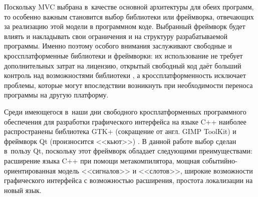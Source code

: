 \documentclass[a4paper, 14pt]{extarticle}
\newcommand{\eng}[1]{{\English #1}}
\begin{document}

  Поскольку MVC выбрана в~качестве основной архитектуры для обеих программ, то особенно важным
  становится выбор библиотеки или фреймворка, отвечающих за реализацию этой модели в программном
  коде. Выбранный фреймворк будет влиять и накладывать свои ограничения и на
  структуру разрабатываемой программы. Именно поэтому особого внимания заслуживают свободные и
  кроссплатформенные библиотеки и фреймворки: их использование не требует дополнительных затрат на
  лицензию, открытый свободный код даёт больший контроль над возможностями библиотеки \cite{open-source},
  а кроссплатформенность исключает проблемы, которые могут впоследствии возникнуть при необходимости
  переноса программы на другую платформу.

  Среди имеющегося в~наши дни свободного кросплатформенных программного обеспечения для разработки
  графического интерфейса на языке C++ наиболее распространены библиотека GTK+ (сокращение от англ.
  \eng{GIMP ToolKit}) \cite{gtk} и фреймворк Qt (произносится <<кьют>>) \cite{qt}. В данной работе
  выбор сделан в~пользу Qt, поскольку этот фреймворк обладает следующими преимуществами: расширение
  языка C++ при помощи метакомпилятора, мощная событийно-ориентированная модель <<сигналов>> и
  <<слотов>>, широкие возможности графического интерфейса с возможностью расширения, простота
  локализации на новый язык.
\end{document}

